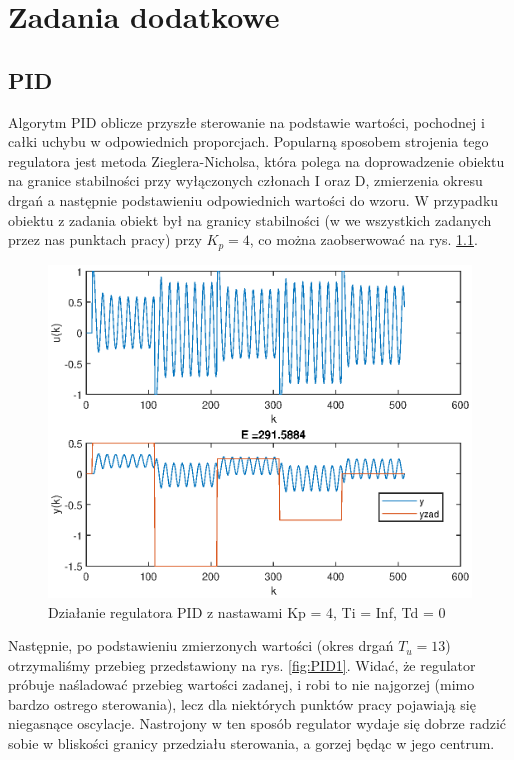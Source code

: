 \chapter{Zadania dodatkowe}
	\label{ch:dod}
	\section{PID}
		\label{sec:PID}
		Algorytm PID oblicze przyszłe sterowanie na podstawie wartości, pochodnej i całki uchybu w odpowiednich proporcjach. Popularną sposobem strojenia tego regulatora jest metoda Zieglera-Nicholsa, która polega na doprowadzenie obiektu na granice stabilności przy wyłączonych członach I oraz D, zmierzenia okresu drgań a następnie podstawieniu odpowiednich wartości do wzoru. W przypadku obiektu z zadania obiekt był na granicy stabilności (w we wszystkich zadanych przez nas punktach pracy) przy $K_p=4$, co można zaobserwować na rys. \ref{fig:PID0}.
		
		\begin{figure}[h!]
			\centering
			\includegraphics[width=\linewidth]{img/strojeniePID_Kp_4_Ti_duzo_Td_0.eps}
			\caption{Działanie regulatora PID z nastawami Kp = 4, Ti = Inf, Td = 0}
			\label{fig:PID0}
		\end{figure}
		
		\newpage
		Następnie, po podstawieniu zmierzonych wartości (okres drgań $T_u=13$) otrzymaliśmy przebieg przedstawiony na rys. \ref{fig:PID1}.
		Widać, że regulator próbuje naśladować przebieg wartości zadanej, i robi to nie najgorzej (mimo bardzo ostrego sterowania), lecz dla niektórych punktów pracy pojawiają się niegasnące oscylacje. Nastrojony w ten sposób regulator wydaje się dobrze radzić sobie w bliskości granicy przedziału sterowania, a gorzej będąc w jego centrum.
		
